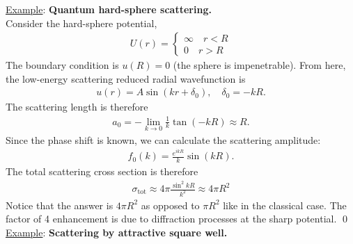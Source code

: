 \documentclass{book}
\theoremstyle{definition}
\newcommand{\f}[2]{\frac{#1}{#2}}
\begin{document}
\noindent \underline{Example}: \textbf{Quantum hard-sphere scattering.}\\

Consider the hard-sphere potential,
\begin{align*}
	U(r) = \begin{cases}
		\infty \quad r < R \\
		0 \quad r > R
	\end{cases}
\end{align*}
The boundary condition is $u(R) = 0$ (the sphere is impenetrable). From here, the low-energy scattering reduced radial wavefunction is 
\begin{align*}
	u(r) = A\sin(kr + \delta_0), \quad \delta_0 = -kR.
\end{align*}
The scattering length is therefore 
\begin{align*}
	a_0 = -\lim_{k\to 0} \f{1}{k}\tan (-kR) \approx R.
\end{align*}
Since the phase shift is known, we can calculate the scattering amplitude:
\begin{align*}
	f_0(k) = \f{e^{ikR}}{k}\sin(kR).
\end{align*}
The total scattering cross section is therefore
\begin{align*}
	\sigma_\text{tot} \approx 4\pi \f{\sin^2 kR}{k^2} \approx 4\pi R^2
\end{align*}
Notice that the answer is $4\pi R^2$ as opposed to $\pi R^2$ like in the classical case. The factor of 4 enhancement is due to diffraction processes at the sharp potential. \qed\\



\noindent \underline{Example}: \textbf{Scattering by attractive square well.}\\
\end{document}

